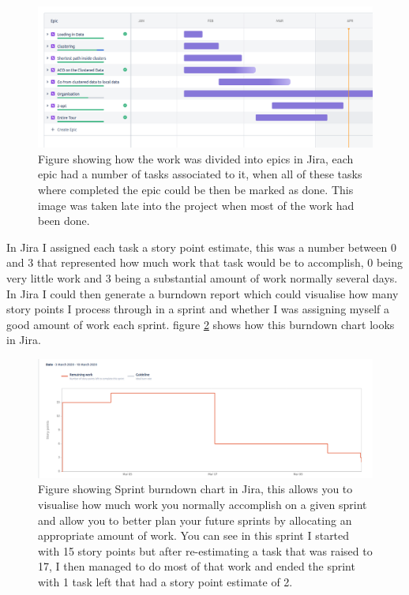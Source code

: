 \begin{figure}
    \centering
    \includegraphics[width=\textwidth]{Project Report/LaTeX Template/figures/jira_epics.png}
    \caption{Figure showing how the work was divided into epics in Jira, each epic had a number of tasks associated to it, when all of these tasks where completed the epic could be then be marked as done. This image was taken late into the project when most of the work had been done.}
    \label{fig:jira_epics}
\end{figure}

In Jira I assigned each task a story point estimate, this was a number between 0 and 3 that represented how much work that task would be to accomplish, 0 being very little work and 3 being a substantial amount of work normally several days. In Jira I could then generate a burndown report which could visualise how many story points I process through in a sprint and whether I was assigning myself a good amount of work each sprint. figure \ref{fig:jira_burndown} shows how this burndown chart looks in Jira.

\begin{figure}
    \centering
    \includegraphics[width=\textwidth]{Project Report/LaTeX Template/figures/jira_sprint_burndown.png}
    \caption{Figure showing Sprint burndown chart in Jira, this allows you to visualise how much work you normally accomplish on a given sprint and allow you to better plan your future sprints by allocating an appropriate amount of work. You can see in this sprint I started with 15 story points but after re-estimating a task that was raised to 17, I then managed to do most of that work and ended the sprint with 1 task left that had a story point estimate of 2.}
    \label{fig:jira_burndown}
\end{figure}


